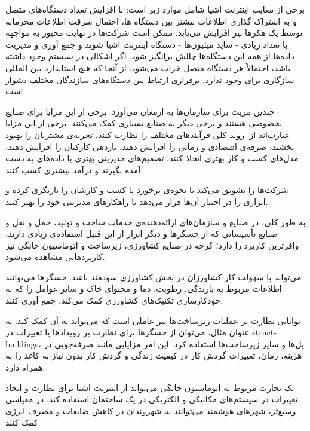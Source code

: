 برخی از معایب اینترنت اشیا شامل موارد زیر است:
 با افزایش تعداد دستگاه‌های متصل و به اشتراک گذاری اطلاعات بیشتر بین دستگاه ها، احتمال سرقت اطلاعات محرمانه توسط یک هکرها نیز افزایش می‌یابد.
 ممکن است شرکت‌ها در نهایت مجبور به مواجهه با تعداد زیادی - شاید میلیون‌ها - دستگاه اینترنت اشیا شوند و جمع آوری و مدیریت داده‌ها از همه این دستگاه‌ها چالش برانگیز شود.
 اگر اشکالی در سیستم وجود داشته باشد، احتمالاً هر دستگاه متصل خراب می‌شود.
 از آنجا که هیچ استاندارد بین المللی سازگاری برای  وجود ندارد، برقراری ارتباط بین دستگاه‌های سازندگان مختلف دشوار است.


 چندین مزیت برای سازمان‌ها به ارمغان می‌آورد. برخی از این مزایا برای صنایع بخصوصی هستند و برخی دیگر به صنایع بسیاری کمک می‌کنند. برخی از این مزایا عبارت‌اند از:
 روند کلی فرآیندهای مختلف را نظارت کنند،
 تجربه‌ی مشتریان را بهبود بخشند،
 صرفه‌ی اقتصادی و زمانی را افزایش دهند،
 بازدهی کارکنان را افزایش دهند،
 مدل‌های کسب و کار بهتری اتخاذ کنند،
 تصمیم‌های مدیریتی بهتری با داده‌های به دست آمده بگیرند و
 درآمد بیشتری کسب کنند.

 شرکت‌ها را تشویق می‌کند تا نحوه‌ی برخورد با کسب و کارشان را بازنگری کرده و ابزاری را در اختیار آن‌ها قرار می‌دهد تا راهکارهای مدیریتی خود را بهتر کنند.

به طور کلی، در صنایع و سازمان‌های ارائه‌دهنده‌ی خدمات ساخت و تولید، حمل و نقل و صنایع تأسیساتی که از حسگرها و دیگر ابزار از این قبیل استفاده‌ی زیادی دارند،  وافرترین کاربرد را دارد؛ گرچه در صنایع کشاورزی، زیرساخت و اتوماسیون خانگی نیز کاربردهایی مشاهده می‌شود.

 می‌تواند با سهولت کار کشاورزان در بخش کشاورزی سودمند باشد. حسگرها می‌توانند اطلاعات مربوط به بارندگی، رطوبت، دما و محتوای خاک و سایر عوامل را که به خودکارسازی تکنیک‌های کشاورزی کمک می‌کند، جمع آوری کنند.

توانایی نظارت بر عملیات زیرساخت‌ها نیز عاملی است که  می‌تواند به آن کمک کند. به عنوان مثال، می‌توان از حسگرها برای نظارت بر رویدادها یا تغییرات در \glspl{struct-building}، پل‌ها و سایر زیرساخت‌ها استفاده کرد. این امر مزایایی مانند صرفه‌جویی در هزینه، زمان، تغییرات گردش کار در کیفیت زندگی و گردش کار بدون نیاز به کاغذ را به همراه دارد.

یک تجارت مربوط به اتوماسیون خانگی می‌تواند از اینترنت اشیا برای نظارت و ایجاد تغییرات در سیستم‌های مکانیکی و الکتریکی در یک ساختمان استفاده کند. در مقیاسی وسیع‌تر، شهرهای هوشمند می‌توانند به شهروندان در کاهش ضایعات و مصرف انرژی کمک کنند.

